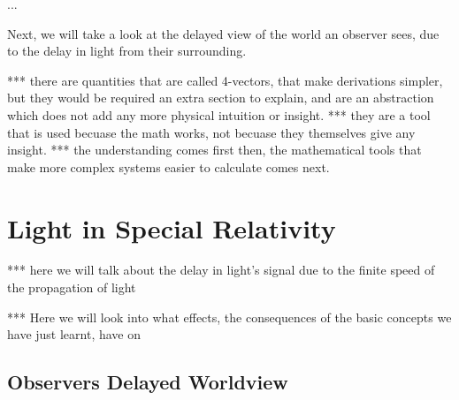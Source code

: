 ...

Next, we will take a look at the delayed view of the world an observer sees, due to the delay in light from their surrounding.


*** there are quantities that are called 4-vectors, that make derivations simpler, but they would be required an extra section to explain, and are an abstraction which does not add any more physical intuition or insight.
*** they are a tool that is used becuase the math works, not becuase they themselves give any insight.
*** the understanding comes first then, the mathematical tools that make more complex systems easier to calculate comes next.




\part{Light in Special Relativity}

*** here we will talk about the delay in light's signal due to the finite speed of the propagation of light

*** Here we will look into what effects, the consequences of the basic concepts we have just learnt, have on


\chapter{Observers Delayed Worldview} \label{ch: Observers Delayed Worldview}

